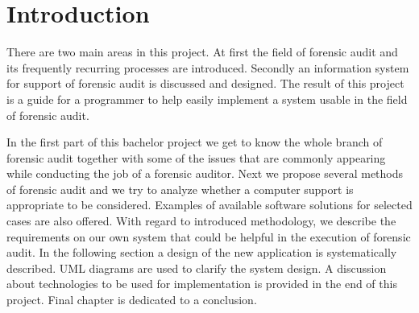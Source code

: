 \chapter*{Introduction} \label{Introduction}



%




There are two main areas in this project. At first the field of forensic audit and its frequently recurring processes are introduced. Secondly an information system for support of forensic audit is discussed and designed. The result of this project is a guide for a programmer to help easily implement a system usable in the field of forensic audit.


In the first part of this bachelor project we get to know the whole branch of forensic audit together with some of the issues that are commonly appearing while conducting the job of a forensic auditor. Next we propose several methods of forensic audit and we try to analyze whether a computer support is appropriate to be considered. Examples of available software solutions for selected cases are also offered. With regard to introduced methodology, we describe the requirements on our own system that could be helpful in the execution of forensic audit. In the following section a design of the new application is systematically described. UML diagrams are used to clarify the system design. A discussion about technologies to be used for implementation is provided in the end of this project. Final chapter is dedicated to a conclusion. 



